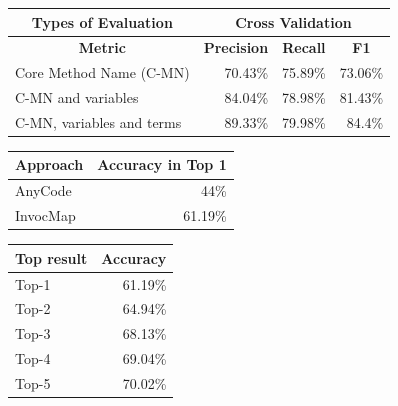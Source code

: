 \documentclass[sigconf,review,anonymous]{article}
\begin{document}
\begin{table}[]
\centering
\begin{tabular}{|l|r|r|r|}
\hline
\multicolumn{1}{|c|}{\textbf{Types of Evaluation}} & \multicolumn{3}{c|}{\textbf{Cross Validation}}                                                                                             \\ \hline
\multicolumn{1}{|c|}{\textbf{Metric}}              & \multicolumn{1}{c|}{\textbf{Precision}} & \multicolumn{1}{c|}{\textbf{Recall}} & \multicolumn{1}{c|}{\textbf{F1}}  \\ \hline
Core Method Name (C-MN)                            & 70.43\%                                   & 75.89\%                                & 73.06\%                                                        \\ \hline
C-MN and variables                                 & 84.04\%                                   & 78.98\%                                & 81.43\%                                                      \\ \hline
C-MN, variables and terms                          & 89.33\%                                   & 79.98\%                                & 84.4\%                                                            \\ \hline
\end{tabular}
\end{table}


\begin{table}[]
\centering
\begin{tabular}{|l|r|}
\hline
\multicolumn{1}{|c|}{\textbf{Approach}} & \multicolumn{1}{c|}{\textbf{Accuracy in Top 1}} \\ \hline
AnyCode                                 & 44\%                                            \\ \hline
InvocMap                                & 61.19\%                                         \\ \hline
\end{tabular}
\end{table}

\begin{table}[]
\centering
\begin{tabular}{|l|r|}
\hline
\multicolumn{1}{|c|}{\textbf{Top result}} & \multicolumn{1}{c|}{\textbf{Accuracy}} \\ \hline
Top-1                                     & 61.19\%                                \\ \hline
Top-2                                     & 64.94\%                                \\ \hline
Top-3                                     & 68.13\%                                \\ \hline
Top-4                                     & 69.04\%                                \\ \hline
Top-5                                     & 70.02\%                                \\ \hline
\end{tabular}
\end{table}
\end{document}
